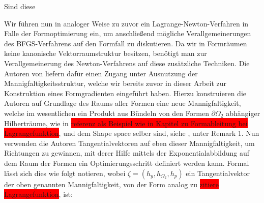 \documentclass[bibliography=totoc,12pt,a4paper]{scrartcl}
\theoremstyle{exampstyle}
\numberwithin{equation}{section}
\begin{document}
Sind diese 

Wir führen nun in analoger Weise zu zuvor ein Lagrange-Newton-Verfahren in Falle der Formoptimierung ein, um anschließend mögliche Verallgemeinerungen des BFGS-Verfahrens auf den Formfall zu diskutieren.
Da wir in Formräumen keine kanonische Vektorraumstruktur besitzen, benötigt man zur Verallgemeinerung des Newton-Verfahrens auf diese zusätzliche Techniken.
Die Autoren von \cite{LagrangeNewton} liefern dafür einen Zugang unter Ausnutzung der Mannigfaltigkeitsstruktur, welche wir bereits zuvor in dieser Arbeit zur Konstruktion eines Formgradienten eingeführt haben. Hierzu konstruieren die Autoren auf Grundlage des Raums aller Formen eine neue Mannigfaltigkeit, welche im wesentlichen ein Produkt aus Bündeln von den Formen $\partial\Omega_2$ abhängiger Hilberträume, wie in \colorbox{red}{referenz als Beispiel wie in Kapitel zu Formableitung bei Lagrangefunktion}, und dem Shape space selber sind, siehe \cite{LagrangeNewton}, unter Remark 1.  Nun verwenden die Autoren Tangentialvektoren auf eben dieser Mannigfaltigkeit, um Richtungen zu gewinnen, mit derer Hilfe mittels der Exponentialabbildung auf dem Raum der Formen ein Optimierungsschritt definiert werden kann. Formal lässt sich dies wie folgt notieren, wobei $\zeta = (h_y, h_{\Omega_2}, h_p)$ ein Tangentialvektor der oben genannten Mannigfaltigkeit, von der Form analog zu \colorbox{red}{zitiere Lagrangefunktion}, ist:
\end{document}
